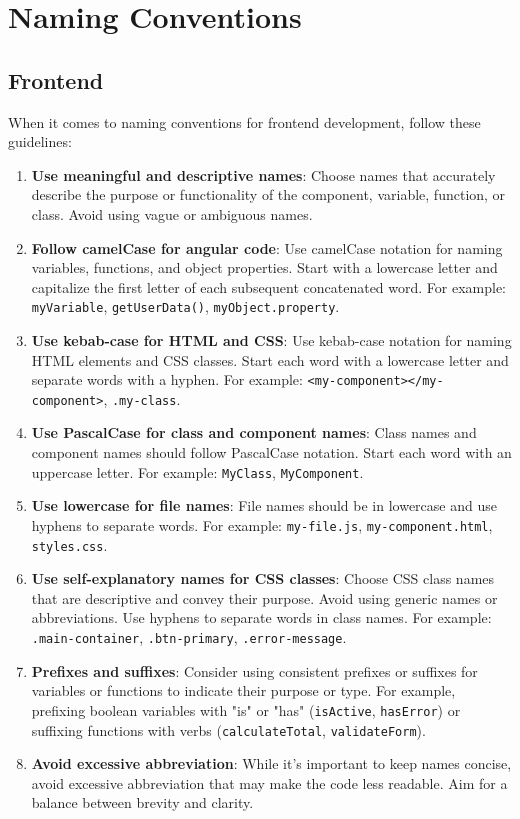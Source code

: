 \documentclass[12pt]{article}
\begin{document}
\newpage
\section{Naming Conventions}
\subsection{Frontend}

When it comes to naming conventions for frontend development, follow these guidelines:

\begin{enumerate}
    \item \textbf{Use meaningful and descriptive names}: Choose names that accurately describe the purpose or functionality of the component, variable, function, or class. Avoid using vague or ambiguous names.

    \item \textbf{Follow camelCase for angular code}: Use camelCase notation for naming variables, functions, and object properties. Start with a lowercase letter and capitalize the first letter of each subsequent concatenated word. For example: \texttt{myVariable}, \texttt{getUserData()}, \texttt{myObject.property}.

    \item \textbf{Use kebab-case for HTML and CSS}: Use kebab-case notation for naming HTML elements and CSS classes. Start each word with a lowercase letter and separate words with a hyphen. For example: \texttt{<my-component></my-component>}, \texttt{.my-class}.

    \item \textbf{Use PascalCase for class and component names}: Class names and component names should follow PascalCase notation. Start each word with an uppercase letter. For example: \texttt{MyClass}, \texttt{MyComponent}.

    \item \textbf{Use lowercase for file names}: File names should be in lowercase and use hyphens to separate words. For example: \texttt{my-file.js}, \texttt{my-component.html}, \texttt{styles.css}.

    \item \textbf{Use self-explanatory names for CSS classes}: Choose CSS class names that are descriptive and convey their purpose. Avoid using generic names or abbreviations. Use hyphens to separate words in class names. For example: \texttt{.main-container}, \texttt{.btn-primary}, \texttt{.error-message}.

    \item \textbf{Prefixes and suffixes}: Consider using consistent prefixes or suffixes for variables or functions to indicate their purpose or type. For example, prefixing boolean variables with "is" or "has" (\texttt{isActive}, \texttt{hasError}) or suffixing functions with verbs (\texttt{calculateTotal}, \texttt{validateForm}).

    \item \textbf{Avoid excessive abbreviation}: While it's important to keep names concise, avoid excessive abbreviation that may make the code less readable. Aim for a balance between brevity and clarity.
\end{enumerate}
\end{document}
